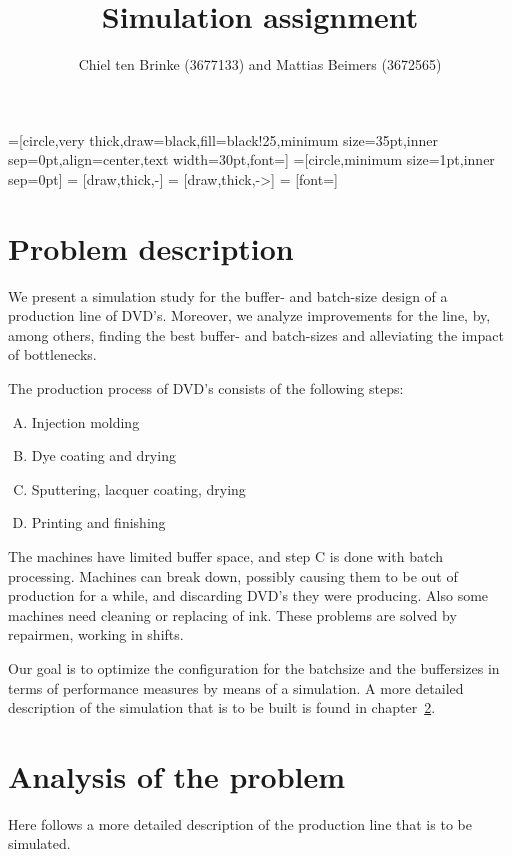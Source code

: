 \documentclass{article}
\title{Simulation assignment}
\author{Chiel ten Brinke (3677133) and Mattias Beimers (3672565)}
\date{\vspace{-3ex}}
\begin{document}
=[circle,very thick,draw=black,fill=black!25,minimum size=35pt,inner sep=0pt,align=center,text width=30pt,font=\scriptsize]
=[circle,minimum size=1pt,inner sep=0pt]
 = [draw,thick,-]
 = [draw,thick,->]
 = [font=\scriptsize]

\maketitle


\section{Problem description}
We present a simulation study for the buffer- and batch-size design of a production line of DVD's.
Moreover, we analyze improvements for the line, by, among others, finding the best buffer- and batch-sizes and alleviating the impact of bottlenecks.

The production process of DVD's consists of the following steps:
\begin{enumerate}[A.]
    \item Injection molding
    \item Dye coating and drying
    \item Sputtering, lacquer coating, drying
    \item Printing and finishing
\end{enumerate}
The machines have limited buffer space, and step C is done with batch processing.
Machines can break down, possibly causing them to be out of production for a while,
and discarding DVD's they were producing. Also some machines need cleaning or replacing of ink.
These problems are solved by repairmen, working in shifts.

Our goal is to optimize the configuration for the batchsize and the buffersizes in terms of performance measures by means of a simulation.
A more detailed description of the simulation that is to be built is found in chapter~\ref{problem_analysis}.

\section{Analysis of the problem}
\label{problem_analysis}
Here follows a more detailed description of the production line that is to be simulated.
\end{document}
